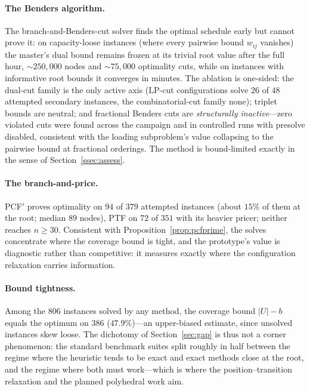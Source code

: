 \documentclass[11pt,a4paper]{article}
\theoremstyle{plain}
\theoremstyle{definition}
\theoremstyle{remark}
\newcommand{\U}{U}
\begin{document}
\paragraph{The Benders algorithm.}
The branch-and-Benders-cut solver finds the optimal schedule early but cannot
prove it: on capacity-loose instances (where every pairwise bound $w_{ij}$
vanishes) the master's dual bound remains frozen at its trivial root value
after the full hour, ${\sim}250{,}000$ nodes and ${\sim}75{,}000$ optimality
cuts, while on instances with informative root bounds it converges in minutes.
The ablation is one-sided: the dual-cut family is the only active axis
(LP-cut configurations solve $26$ of $48$ attempted secondary instances, the
combinatorial-cut family none); triplet bounds are neutral; and fractional
Benders cuts are \emph{structurally inactive}---zero violated cuts were found
across the campaign and in controlled runs with presolve disabled, consistent
with the loading subproblem's value collapsing to the pairwise bound at
fractional orderings. The method is bound-limited exactly in the sense of
Section~\ref{ssec:assess}.

\paragraph{The branch-and-price.}
PCF$'$ proves optimality on $94$ of $379$ attempted instances (about $15\%$ of
them at the root; median $89$ nodes), PTF on $72$ of $351$ with its heavier
pricer; neither reaches $n\ge30$. Consistent with
Proposition~\ref{prop:pcfprime}, the solves concentrate where the coverage
bound is tight, and the prototype's value is diagnostic rather than
competitive: it measures exactly where the configuration relaxation carries
information.

\paragraph{Bound tightness.}
Among the $806$ instances solved by any method, the coverage bound
$\lvert\U\rvert-b$ equals the optimum on $386$ ($47.9\%$)---an upper-biased
estimate, since unsolved instances skew loose. The dichotomy of
Section~\ref{sec:gap} is thus not a corner phenomenon: the standard benchmark
suites split roughly in half between the regime where the heuristic tends to
be exact and exact methods close at the root, and the regime where both must
work---which is where the position--transition relaxation and the planned
polyhedral work aim.
\end{document}
